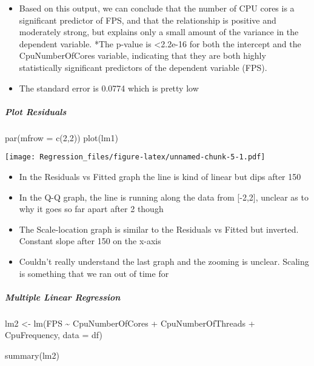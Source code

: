 \documentclass[
]{article}
\newenvironment{Shaded}{\begin{snugshade}}{\end{snugshade}}
\newcommand{\AttributeTok}[1]{\textcolor[rgb]{0.77,0.63,0.00}{#1}}
\newcommand{\DecValTok}[1]{\textcolor[rgb]{0.00,0.00,0.81}{#1}}
\newcommand{\FunctionTok}[1]{\textcolor[rgb]{0.00,0.00,0.00}{#1}}
\newcommand{\NormalTok}[1]{#1}
\newcommand{\OtherTok}[1]{\textcolor[rgb]{0.56,0.35,0.01}{#1}}
\newcommand{\SpecialCharTok}[1]{\textcolor[rgb]{0.00,0.00,0.00}{#1}}
\providecommand{\tightlist}{%
  \setlength{\itemsep}{0pt}\setlength{\parskip}{0pt}}
\begin{document}
\begin{itemize}
\tightlist
\item
  Based on this output, we can conclude that the number of CPU cores is
  a significant predictor of FPS, and that the relationship is positive
  and moderately strong, but explains only a small amount of the
  variance in the dependent variable. *The p-value is \textless2.2e-16
  for both the intercept and the CpuNumberOfCores variable, indicating
  that they are both highly statistically significant predictors of the
  dependent variable (FPS).
\item
  The standard error is 0.0774 which is pretty low
\end{itemize}

\hypertarget{plot-residuals}{%
\subparagraph{Plot Residuals}\label{plot-residuals}}

\begin{Shaded}
\begin{Highlighting}[]
\FunctionTok{par}\NormalTok{(}\AttributeTok{mfrow =} \FunctionTok{c}\NormalTok{(}\DecValTok{2}\NormalTok{,}\DecValTok{2}\NormalTok{))}
\FunctionTok{plot}\NormalTok{(lm1)}
\end{Highlighting}
\end{Shaded}

\texttt{[image: Regression\_files/figure-latex/unnamed-chunk-5-1.pdf]}

\begin{itemize}
\tightlist
\item
  In the Residuals vs Fitted graph the line is kind of linear but dips
  after 150
\item
  In the Q-Q graph, the line is running along the data from {[}-2,2{]},
  unclear as to why it goes so far apart after 2 though
\item
  The Scale-location graph is similar to the Residuals vs Fitted but
  inverted. Constant slope after 150 on the x-axis
\item
  Couldn't really understand the last graph and the zooming is unclear.
  Scaling is something that we ran out of time for
\end{itemize}

\hypertarget{multiple-linear-regression}{%
\subparagraph{Multiple Linear
Regression}\label{multiple-linear-regression}}

\begin{Shaded}
\begin{Highlighting}[]
\NormalTok{lm2 }\OtherTok{\textless{}{-}} \FunctionTok{lm}\NormalTok{(FPS }\SpecialCharTok{\textasciitilde{}}\NormalTok{ CpuNumberOfCores }\SpecialCharTok{+}\NormalTok{ CpuNumberOfThreads }\SpecialCharTok{+}\NormalTok{  CpuFrequency, }\AttributeTok{data =}\NormalTok{ df)}

\FunctionTok{summary}\NormalTok{(lm2)}
\end{Highlighting}
\end{Shaded}
\end{document}
